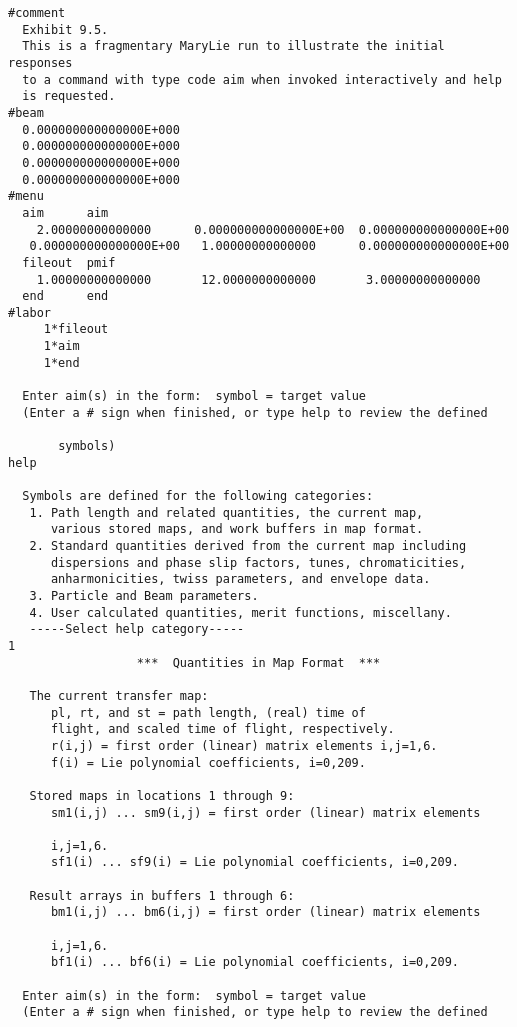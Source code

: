 \vspace{5mm}
\begin{footnotesize}
\begin{verbatim}
#comment
  Exhibit 9.5.
  This is a fragmentary MaryLie run to illustrate the initial responses
  to a command with type code aim when invoked interactively and help
  is requested.
#beam
  0.000000000000000E+000
  0.000000000000000E+000
  0.000000000000000E+000
  0.000000000000000E+000
#menu
  aim      aim
    2.00000000000000      0.000000000000000E+00  0.000000000000000E+00
   0.000000000000000E+00   1.00000000000000      0.000000000000000E+00
  fileout  pmif
    1.00000000000000       12.0000000000000       3.00000000000000
  end      end
#labor
     1*fileout
     1*aim
     1*end

  Enter aim(s) in the form:  symbol = target value
  (Enter a # sign when finished, or type help to review the defined

       symbols)
help

  Symbols are defined for the following categories:
   1. Path length and related quantities, the current map,
      various stored maps, and work buffers in map format.
   2. Standard quantities derived from the current map including
      dispersions and phase slip factors, tunes, chromaticities,
      anharmonicities, twiss parameters, and envelope data.
   3. Particle and Beam parameters.
   4. User calculated quantities, merit functions, miscellany.
   -----Select help category-----
1
                  ***  Quantities in Map Format  ***

   The current transfer map:
      pl, rt, and st = path length, (real) time of
      flight, and scaled time of flight, respectively.
      r(i,j) = first order (linear) matrix elements i,j=1,6.
      f(i) = Lie polynomial coefficients, i=0,209.

   Stored maps in locations 1 through 9:
      sm1(i,j) ... sm9(i,j) = first order (linear) matrix elements

      i,j=1,6.
      sf1(i) ... sf9(i) = Lie polynomial coefficients, i=0,209.

   Result arrays in buffers 1 through 6:
      bm1(i,j) ... bm6(i,j) = first order (linear) matrix elements

      i,j=1,6.
      bf1(i) ... bf6(i) = Lie polynomial coefficients, i=0,209.

  Enter aim(s) in the form:  symbol = target value
  (Enter a # sign when finished, or type help to review the defined


\end{verbatim}
\end{footnotesize}
